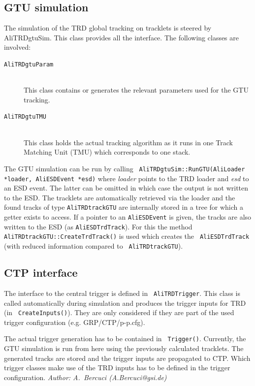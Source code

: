 \documentclass{alicetdr}
\begin{document}
\subsection{GTU simulation}

The simulation of the TRD global tracking on tracklets is steered by
AliTRDgtuSim. This class provides all the interface. The following
classes are involved:
\begin{description}
\item[{\tt AliTRDgtuParam}] ~\\ This class contains or generates the relevant
  parameters used for the GTU tracking.
\item[{\tt AliTRDgtuTMU}] ~\\ This class holds the actual tracking algorithm
  as it runs in one Track Matching Unit (TMU) which corresponds to one
  stack.
\end{description}

The GTU simulation can be run by calling {\tt
  AliTRDgtuSim::RunGTU(AliLoader *loader, AliESDEvent *esd)} where
{\it loader} points to the TRD loader and {\it esd} to an ESD
event. The latter can be omitted in which case the output is not
written to the ESD. The tracklets are automatically retrieved via the
loader and the found tracks of type {\tt AliTRDtrackGTU} are
internally stored in a tree for which a getter exists to access. If a
pointer to an {\tt AliESDEvent} is given, the tracks are also written
to the ESD (as {\tt AliESDTrdTrack}). For this the method {\tt
  AliTRDtrackGTU::CreateTrdTrack()} is used which creates the {\tt
  AliESDTrdTrack} (with reduced information compared to {\tt
  AliTRDtrackGTU}).

\subsection{CTP interface}

The interface to the central trigger is defined in {\tt
  AliTRDTrigger}. This class is called automatically during simulation
and produces the trigger inputs for TRD (in {\tt
  CreateInputs()}). They are only considered if they are part of the
used trigger configuration (e.g. GRP/CTP/p-p.cfg).

The actual trigger generation has to be contained in {\tt
  Trigger()}. Currently, the GTU simulation is run from here using the
previously calculated tracklets. The generated tracks are stored and
the trigger inputs are propagated to CTP. Which trigger classes make
use of the TRD inputs has to be defined in the trigger configuration.
%
\newpage
\setcounter{chapter}{2}
\setcounter{section}{0}
\label{REC:}
{\it Author: A.~Bercuci (A.Bercuci@gsi.de)}
\thispagestyle{empty}
%
\end{document}
